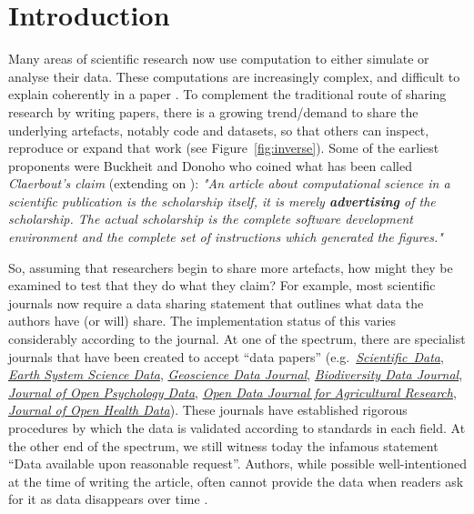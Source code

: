 \documentclass[12pt]{article}
\begin{document}
\section*{Introduction}\label{introduction}

Many areas of scientific research now use computation to either simulate
or analyse their data. These computations are increasingly complex, and
difficult to explain coherently in a paper \citep{marwick_how_2015}.
To complement the traditional route of sharing research by writing papers,
there is a growing trend/demand to share the underlying artefacts, notably 
code and datasets, so that others can inspect, reproduce or expand that work
(see Figure~\ref{fig:inverse}).
Some of the earliest proponents were Buckheit and Donoho
\cite{buckheit_wavelab_1995} who coined what has been called 
\emph{Claerbout's claim} (extending on \citet{claerbout_electronic_1992}):
\emph{"An article about computational science in a scientific publication 
is  the scholarship itself, it is merely \textbf{advertising} of
the scholarship. The actual scholarship is the complete software development
environment and the complete set of instructions which generated the 
figures."}

So, assuming that researchers begin to share more artefacts, how might
they be examined to test that they do what they claim? For example,
most scientific journals now require a data sharing statement that
outlines what data the authors have (or will) share.
The implementation status of this varies considerably according to the
journal. At one of the spectrum, there are specialist journals that
have been created to accept ``data papers''
(e.g.~\href{https://www.nature.com/sdata/}{\emph{Scientific~Data}}, 
\href{https://essd.copernicus.org/}{\emph{Earth System Science Data}}, 
\href{https://rmets.onlinelibrary.wiley.com/journal/20496060}{\emph{Geoscience Data Journal}},
\href{https://bdj.pensoft.net/}{\emph{Biodiversity Data Journal}},
\href{https://openpsychologydata.metajnl.com/}{\emph{Journal of Open Psychology Data}},
\href{https://odjar.org/}{\emph{Open Data Journal for Agricultural Research}},
\href{https://openhealthdata.metajnl.com}{\emph{Journal of Open Health Data}}).
These journals have established rigorous procedures by which
the data is validated according to standards in each field. At the
other end of the spectrum, we still witness today the infamous
statement ``Data available upon reasonable request''. Authors,
while possible well-intentioned at the time of writing the article,
often cannot provide the data when readers ask for
it as data disappears over time \cite{Vines2014-hf}.
\end{document}
